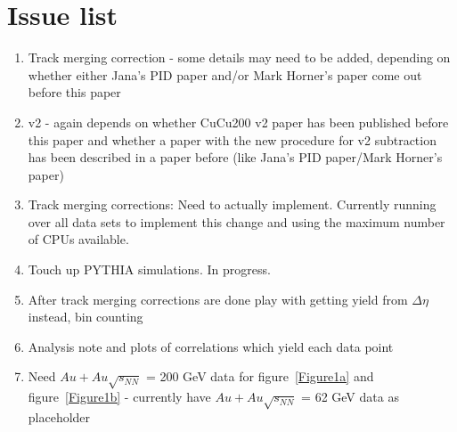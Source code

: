 \documentclass[aps,prc,twocolumn,groupedaddress,showpacs,preprintnumbers,amsmath,amssymb]{revtex4}
\newcommand{\sNNtwohundred}{$\sqrt{s_{NN}}$ = 200 GeV\xspace}
\newcommand{\sNNsixtytwo}{$\sqrt{s_{NN}}$ = 62 GeV\xspace}
\newcommand{\Au}{$Au+Au$\xspace}
\newcommand{\deta}{$\Delta\eta$\xspace}
\newcommand{\PT}{PYTHIA\xspace}
\newcommand{\fref}[1]{figure~\ref{#1}}
\begin{document}
\section{Issue list}
\begin{enumerate}
\item Track merging correction - some details may need to be added, depending on whether either Jana's PID paper and/or Mark Horner's paper come out before this paper
\item v2 - again depends on whether CuCu200 v2 paper has been published before this paper and whether a paper with the new procedure for v2 subtraction has been described in a paper before (like Jana's PID paper/Mark Horner's paper)
\item Track merging corrections:  Need to actually implement.  Currently running over all data sets to implement this change and using the maximum number of CPUs available.
\item Touch up \PT simulations.  In progress.
\item After track merging corrections are done play with getting yield from \deta instead, bin counting
\item Analysis note and plots of correlations which yield each data point
\item Need \Au \sNNtwohundred data for \fref{Figure1a} and \fref{Figure1b} - currently have \Au \sNNsixtytwo data as placeholder
\end{enumerate}
\end{document}
